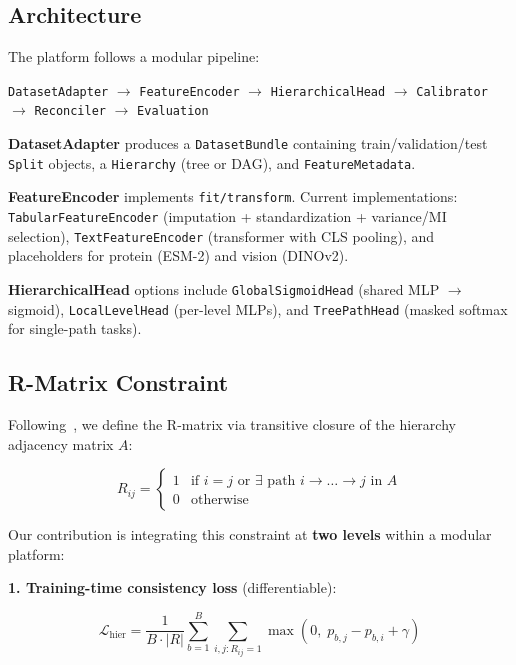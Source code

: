 \documentclass[11pt,a4paper]{article}
\begin{document}
\subsection{Architecture}

The platform follows a modular pipeline:

\begin{center}
\texttt{DatasetAdapter} $\rightarrow$
\texttt{FeatureEncoder} $\rightarrow$
\texttt{HierarchicalHead} $\rightarrow$
\texttt{Calibrator} $\rightarrow$
\texttt{Reconciler} $\rightarrow$
\texttt{Evaluation}
\end{center}

\textbf{DatasetAdapter} produces a \texttt{DatasetBundle} containing
train/validation/test \texttt{Split} objects, a \texttt{Hierarchy}
(tree or DAG), and \texttt{FeatureMetadata}.

\textbf{FeatureEncoder} implements \texttt{fit/transform}. Current
implementations: \texttt{TabularFeatureEncoder} (imputation +
standardization + variance/MI selection), \texttt{TextFeatureEncoder}
(transformer with CLS pooling), and placeholders for protein (ESM-2)
and vision (DINOv2).

\textbf{HierarchicalHead} options include
\texttt{GlobalSigmoidHead} (shared MLP $\rightarrow$ sigmoid),
\texttt{LocalLevelHead} (per-level MLPs), and \texttt{TreePathHead}
(masked softmax for single-path tasks).

\subsection{R-Matrix Constraint}
\label{sec:rmatrix}

Following~\citet{giunchiglia2018hmc}, we define the R-matrix via
transitive closure of the hierarchy adjacency matrix $A$:

\begin{equation}
R_{ij} = \begin{cases}
1 & \text{if } i = j \text{ or } \exists \text{ path } i \rightarrow \ldots \rightarrow j \text{ in } A \\
0 & \text{otherwise}
\end{cases}
\end{equation}

Our contribution is integrating this constraint at \textbf{two levels}
within a modular platform:

\textbf{1. Training-time consistency loss} (differentiable):

\begin{equation}
\mathcal{L}_{\text{hier}} = \frac{1}{B \cdot |R|}
\sum_{b=1}^{B} \sum_{i,j: R_{ij}=1}
\max(0,\; p_{b,j} - p_{b,i} + \gamma)
\label{eq:hierloss}
\end{equation}
\end{document}

